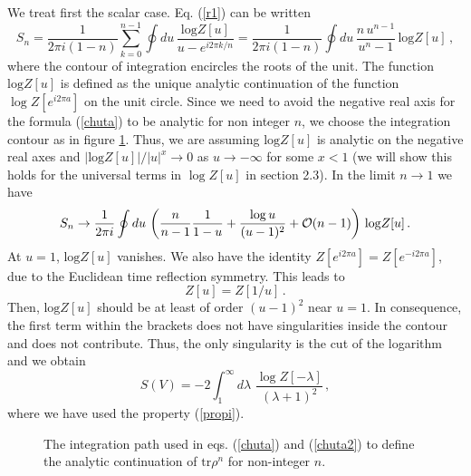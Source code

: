 \documentclass[11pt]{article}
\begin{document}
We treat first the scalar case. Eq. (\ref{r1}) can be written 
\begin{equation}
S_n=\frac{1}{2\pi i (1-n)}\sum_{k=0}^{n-1}\oint du \, \frac{\textrm{log}Z[u]}{u-e^{i 2 \pi k/n}}=\frac{1}{2\pi i (1-n)}\oint du \,\frac{n\, u^{n-1}}{u^n-1}\,\textrm{log}Z[u]\,,\label{chuta}
\end{equation}
where the contour of integration encircles the roots of the unit. The function $\textrm{log}Z[u]$ is defined as the unique analytic continuation of the function $\log Z[e^{i 2\pi a}]$ on the unit circle.
 Since  we need to avoid the negative real axis for the formula (\ref{chuta}) to be analytic for non integer $n$, we choose the integration contour as in figure \ref{figu22}. Thus, we are assuming $\textrm{log}Z[u]$ is analytic on the negative real axes and $\left|\textrm{log} Z[u]\right|/\left|u\right|^x\rightarrow 0$ as $u\rightarrow-\infty$ for some $x<1$ (we will show this holds for the universal terms in $\log Z[u]$ in section 2.3). In the limit $n\rightarrow 1$ we have
\begin{equation}
S_n\rightarrow \frac{1}{2\pi i}\oint du \,\left(\frac{n}{n-1}\frac{1}{1-u}+\frac{\log u}{(u-1)^2}+{\cal O} (n-1)\right)\,\textrm{log}Z[u]\,.\label{chuta1}
\end{equation} 
 At $u=1$, $\textrm{log}Z[u]$ vanishes. We also have the identity $Z[e^{i 2 \pi a}]=Z[e^{-i 2 \pi a}]$, due to the Euclidean time reflection symmetry. This leads to
\begin{equation}
Z[u]=Z[1/u] \label{propi}\,.
\end{equation}
Then,  $\textrm{log}Z[u]$ should be at least of order $(u-1)^2$ near $u=1$. In consequence, the first term within the brackets does not have singularities inside the contour and does not contribute. Thus, the only singularity is the cut of the logarithm and we obtain
\begin{equation}
S(V)=-2\int_1^{\infty}d\lambda\,\, \frac{\log Z[-\lambda]}{(\lambda+1)^2}\,,\label{boti}
\end{equation} 
where we have used the property (\ref{propi}).

\begin{figure} [tbp]
\centering
\leavevmode
\epsfysize=4.3cm
\bigskip
{}
\caption{The integration path used in eqs. (\ref{chuta}) and (\ref{chuta2}) to define the analytic continuation of $\textrm{tr}\rho^n$ for non-integer $n$.}
\label{figu22}
\end{figure}
\end{document}
